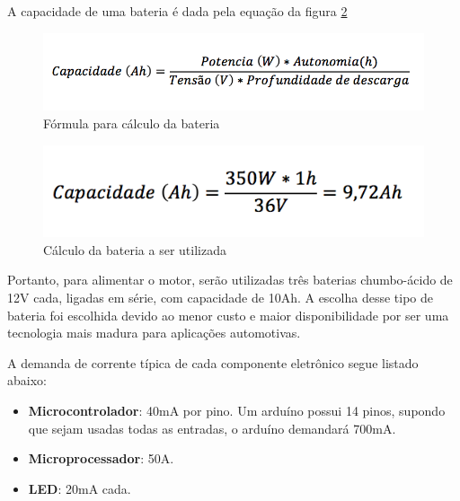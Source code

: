 	A capacidade de uma bateria é dada pela equação da figura \ref{img:calculo_bateria}
	
	\graphicspath{{figuras/}}
	\begin{figure}[h!]
	\centering
	\includegraphics[scale=1.0]{capacidade_bateria}
	\caption{Fórmula para cálculo da bateria}
	\label{img:formula_capacidade}
	\end{figure}
	

	
	\graphicspath{{figuras/}}
	\begin{figure}[!htb]
	\centering
	\includegraphics[scale=1.0]{calculo_capacidade}
	\caption{Cálculo da bateria a ser utilizada}
	\label{img:calculo_bateria}
	\end{figure}
	
	Portanto, para alimentar o motor, serão utilizadas três baterias chumbo-ácido de 12V cada, ligadas em série, com capacidade de 10Ah. A escolha desse tipo de bateria foi escolhida devido ao menor custo e maior disponibilidade por ser uma tecnologia mais madura para aplicações automotivas.

	A demanda de corrente típica de cada componente eletrônico segue listado abaixo:
	
	\begin{itemize}
		\item \textbf{Microcontrolador}: 40mA por pino. Um arduíno possui 14 pinos, supondo que sejam usadas todas as entradas, o arduíno demandará 700mA.
		\item \textbf{Microprocessador}: 50A.
		\item \textbf{LED}: 20mA cada.

	\end{itemize}

